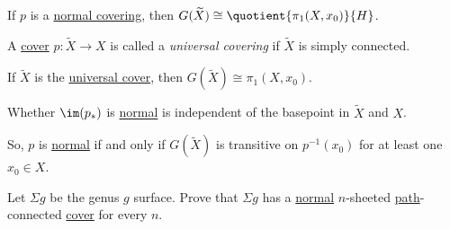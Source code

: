 \begin{corollary}
	If \(p\) is a \hyperref[def:normal-cover]{normal covering}, then \(G(\widetilde{X} ) \cong \quotient{\pi _1(X, x_0)}{H} \).
\end{corollary}

\begin{definition}\label{def:universal-covering}
	A \hyperref[def:covering-map]{cover} \(p\colon \widetilde{X} \to X\) is called a \emph{universal covering} if \(\widetilde{X} \) is simply connected.
\end{definition}

\begin{corollary}
	If \(\widetilde{X} \) is the \hyperref[def:universal-covering]{universal cover}, then \(G(\widetilde{X} )\cong \pi _1(X, x_0)\).
\end{corollary}

\begin{exercise}
	Whether \(\im (p_\ast)\) is \hyperref[def:normal-subgroup]{normal} is independent of the basepoint in \(\widetilde{X} \) and \(X\).
\end{exercise}

So, \(p\) is \hyperref[def:normal-cover]{normal} if and only if \(G(\widetilde{X} )\) is transitive on \(p^{-1} (x_0)\) for at least one \(x_0\in X\).

\begin{exercise}
	Let \(\Sigma g\) be the genus \(g\) surface. Prove that \(\Sigma g\) has a \hyperref[def:normal-cover]{normal} \(n\)-sheeted \hyperref[def:path]{path}-connected \hyperref[def:covering-map]{cover} for every \(n\).
\end{exercise}